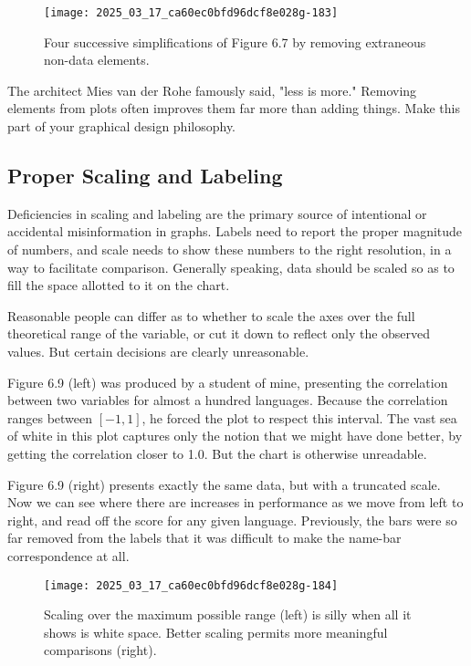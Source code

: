 \documentclass[10pt]{article}
\begin{document}
\begin{figure}[h]
    \centering
    \texttt{[image: 2025\_03\_17\_ca60ec0bfd96dcf8e028g-183]}
    \caption{Four successive simplifications of Figure 6.7 by removing extraneous non-data elements.}
\end{figure}

The architect Mies van der Rohe famously said, "less is more." Removing elements from plots often improves them far more than adding things. Make this part of your graphical design philosophy.

\subsection{Proper Scaling and Labeling}
Deficiencies in scaling and labeling are the primary source of intentional or accidental misinformation in graphs. Labels need to report the proper magnitude of numbers, and scale needs to show these numbers to the right resolution, in a way to facilitate comparison. Generally speaking, data should be scaled so as to fill the space allotted to it on the chart.

Reasonable people can differ as to whether to scale the axes over the full theoretical range of the variable, or cut it down to reflect only the observed values. But certain decisions are clearly unreasonable.

Figure 6.9 (left) was produced by a student of mine, presenting the correlation between two variables for almost a hundred languages. Because the correlation ranges between $[-1, 1]$, he forced the plot to respect this interval. The vast sea of white in this plot captures only the notion that we might have done better, by getting the correlation closer to 1.0. But the chart is otherwise unreadable.

Figure 6.9 (right) presents exactly the same data, but with a truncated scale. Now we can see where there are increases in performance as we move from left to right, and read off the score for any given language. Previously, the bars were so far removed from the labels that it was difficult to make the name-bar correspondence at all.

\begin{figure}[h]
    \centering
    \texttt{[image: 2025\_03\_17\_ca60ec0bfd96dcf8e028g-184]}
    \caption{Scaling over the maximum possible range (left) is silly when all it shows is white space. Better scaling permits more meaningful comparisons (right).}
\end{figure}
\end{document}
